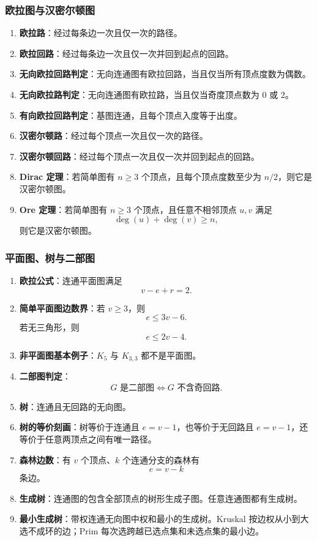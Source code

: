 \subsubsection{欧拉图与汉密尔顿图}

\begin{enumerate}
	\item \textbf{欧拉路}：经过每条边一次且仅一次的路径。
	\item \textbf{欧拉回路}：经过每条边一次且仅一次并回到起点的回路。
	\item \textbf{无向欧拉回路判定}：无向连通图有欧拉回路，当且仅当所有顶点度数为偶数。
	\item \textbf{无向欧拉路判定}：无向连通图有欧拉路，当且仅当奇度顶点数为 \(0\) 或 \(2\)。
	\item \textbf{有向欧拉回路判定}：基图连通，且每个顶点入度等于出度。
	\item \textbf{汉密尔顿路}：经过每个顶点一次且仅一次的路径。
	\item \textbf{汉密尔顿回路}：经过每个顶点一次且仅一次并回到起点的回路。
	\item \textbf{Dirac 定理}：若简单图有 \(n\ge3\) 个顶点，且每个顶点度数至少为 \(n/2\)，则它是汉密尔顿图。
	\item \textbf{Ore 定理}：若简单图有 \(n\ge3\) 个顶点，且任意不相邻顶点 \(u,v\) 满足
	\[
	\deg(u)+\deg(v)\ge n,
	\]
	则它是汉密尔顿图。
\end{enumerate}

\subsubsection{平面图、树与二部图}

\begin{enumerate}
	\item \textbf{欧拉公式}：连通平面图满足
	\[
	v-e+r=2.
	\]
	\item \textbf{简单平面图边数界}：若 \(v\ge3\)，则
	\[
	e\le3v-6.
	\]
	若无三角形，则
	\[
	e\le2v-4.
	\]
	\item \textbf{非平面图基本例子}：\(K_5\) 与 \(K_{3,3}\) 都不是平面图。
	\item \textbf{二部图判定}：
	\[
	G\text{ 是二部图}\Leftrightarrow G\text{ 不含奇回路}.
	\]
	\item \textbf{树}：连通且无回路的无向图。
	\item \textbf{树的等价刻画}：树等价于连通且 \(e=v-1\)，也等价于无回路且 \(e=v-1\)，还等价于任意两顶点之间有唯一路径。
	\item \textbf{森林边数}：有 \(v\) 个顶点、\(k\) 个连通分支的森林有
	\[
	e=v-k
	\]
	条边。
	\item \textbf{生成树}：连通图的包含全部顶点的树形生成子图。任意连通图都有生成树。
	\item \textbf{最小生成树}：带权连通无向图中权和最小的生成树。Kruskal 按边权从小到大选不成环的边；Prim 每次选跨越已选点集和未选点集的最小边。
\end{enumerate}


